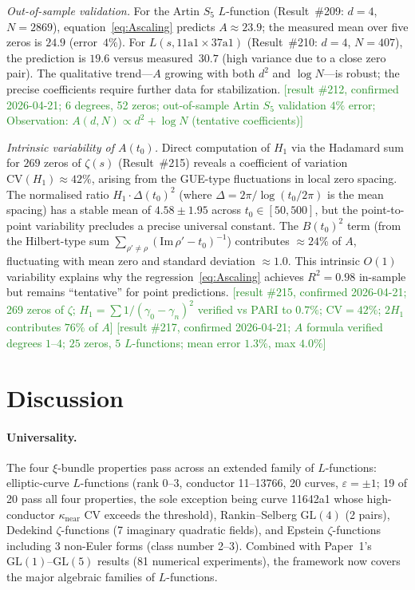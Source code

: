 \documentclass[11pt, a4paper]{article}
\theoremstyle{plain}
\theoremstyle{definition}
\begin{document}
\emph{Out-of-sample validation.}  For the Artin $S_5$ $L$-function
(Result~\#209: $d=4$, $N=2869$), equation~\eqref{eq:Ascaling} predicts
$A\approx 23.9$; the measured mean over five zeros is $24.9$ (error~$4\%$).
For $L(s,\text{11a1}\times\text{37a1})$ (Result~\#210: $d=4$, $N=407$),
the prediction is $19.6$ versus measured~$30.7$ (high variance due to a
close zero pair).  The qualitative trend---$A$ growing with both $d^{2}$
and $\log N$---is robust; the precise coefficients require further data
for stabilization.
\textcolor{ForestGreen}{[result \#212, confirmed 2026-04-21;
6 degrees, 52 zeros; out-of-sample Artin $S_5$ validation $4\%$ error;
Observation: $A(d,N)\propto d^{2}+\log N$ (tentative coefficients)]}

\emph{Intrinsic variability of $A(t_0)$.}  Direct computation of $H_1$
via the Hadamard sum for $269$ zeros of $\zeta(s)$ (Result~\#215) reveals
a coefficient of variation $\mathrm{CV}(H_1)\approx 42\%$, arising from
the GUE-type fluctuations in local zero spacing.  The normalised ratio
$H_1\cdot\Delta(t_0)^2$ (where $\Delta=2\pi/\log(t_0/2\pi)$ is the mean
spacing) has a stable mean of $4.58\pm 1.95$ across $t_0\in[50,500]$,
but the point-to-point variability precludes a precise universal constant.
The $B(t_0)^2$ term (from the Hilbert-type sum
$\sum_{\rho'\neq\rho}(\mathrm{Im}\,\rho'-t_0)^{-1}$) contributes
${\approx}24\%$ of $A$, fluctuating with mean zero and standard deviation
${\approx}1.0$.  This intrinsic $O(1)$ variability explains why the
regression~\eqref{eq:Ascaling} achieves $R^2=0.98$ in-sample but remains
``tentative'' for point predictions.
\textcolor{ForestGreen}{[result \#215, confirmed 2026-04-21;
269 zeros of $\zeta$; $H_1=\sum 1/(\gamma_0-\gamma_n)^2$ verified
vs PARI to $0.7\%$; CV$=42\%$; $2H_1$ contributes $76\%$ of $A$]}
\textcolor{ForestGreen}{[result \#217, confirmed 2026-04-21;
$A$ formula verified degrees $1$--$4$; $25$ zeros, $5$ $L$-functions;
mean error $1.3\%$, max $4.0\%$]}


\section{Discussion}
\label{sec:disc}

\paragraph{Universality.}
The four $\xi$-bundle properties pass across an extended family of
$L$-functions: elliptic-curve $L$-functions (rank 0--3, conductor
11--13766, 20 curves, $\varepsilon=\pm 1$; 19 of 20 pass all four
properties, the sole exception being curve 11642a1 whose high-conductor
$\kappa_{\mathrm{near}}$ CV exceeds the threshold),
Rankin--Selberg $\mathrm{GL}(4)$ (2 pairs), Dedekind $\zeta$-functions
(7 imaginary quadratic fields), and Epstein $\zeta$-functions including
3 non-Euler forms (class number 2--3).  Combined with Paper~1's
$\mathrm{GL}(1)$--$\mathrm{GL}(5)$ results (81 numerical experiments),
the framework now covers the major algebraic families of $L$-functions.
\end{document}
